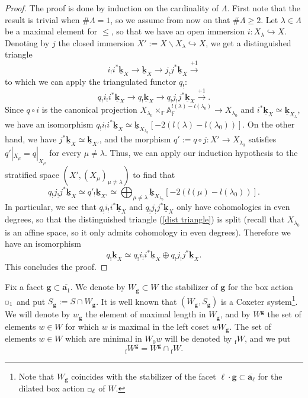 \documentclass[11pt]{amsart}
\theoremstyle{plain}
\theoremstyle{remark}
\newcommand{\car}{\mbox{\relsize{-5}$\Box$}}
\numberwithin{equation}{section}
\begin{document}
	\begin{proof}
		The proof is done by induction on the cardinality of $\Lambda$. First note that the result is trivial when $\#\Lambda=1$, so we assume from now on that $\#\Lambda\geq2$. Let $\lambda\in\Lambda$ be a maximal element for $\leq$, so that we have an open immersion $i:X_\lambda\hookrightarrow X$. Denoting by $j$ the closed immersion $X':=X\backslash X_\lambda\hookrightarrow X$, we get a distinguished triangle
		$$i_!i^* \underline{\mathbf{k}}_X\longrightarrow \underline{\mathbf{k}}_X \longrightarrow j_!j^*\underline{\mathbf{k}}_X\xrightarrow{+1}  $$
		to which we can apply the triangulated functor $q_!$:
		\begin{equation}\label{dist triangle}
			q_!i_!i^* \underline{\mathbf{k}}_X\longrightarrow q_!\underline{\mathbf{k}}_X \longrightarrow q_!j_!j^*\underline{\mathbf{k}}_X\xrightarrow{+1}. 
		\end{equation}
		Since $q\circ i$ is the canonical projection $X_{\lambda_0}\times_{\mathbb{F}} \mathbb{A}_{\mathbb{F}}^{l(\lambda)-l(\lambda_0)}\to X_{\lambda_0}$ and $i^* \underline{\mathbf{k}}_X\simeq \underline{\mathbf{k}}_{X_\lambda}$, we have an isomorphism $q_!i_!i^* \underline{\mathbf{k}}_X\simeq \underline{\mathbf{k}}_{X_{\lambda_0}}[-2(l(\lambda)-l(\lambda_0))]$. On the other hand, we have $j^*\underline{\mathbf{k}}_X\simeq\underline{\mathbf{k}}_{X'}$, and the morphism $q':=q\circ j:X'\to X_{\lambda_0}$ satisfies $q'|_{X_\mu}=q|_{X_\mu}$ for every $\mu\neq\lambda$. Thus, we can apply our induction hypothesis to the stratified space $(X',(X_\mu)_{\mu\neq\lambda})$ to find that 
		$$q_!j_!j^*\underline{\mathbf{k}}_X\simeq q'_!\underline{\mathbf{k}}_{X'}\simeq \bigoplus_{\mu\neq\lambda}\underline{\mathbf{k}}_{X_{\lambda_0}}[-2(l(\mu)-l(\lambda_0))].$$
		In particular, we see that $q_!i_!i^* \underline{\mathbf{k}}_X$ and $q_!j_!j^*\underline{\mathbf{k}}_X$ only have cohomologies in even degrees, so that the distinguished triangle (\ref{dist triangle}) is split (recall that $X_{\lambda_0}$ is an affine space, so it only admits cohomology in even degrees). Therefore we have an isomorphism
		$$ q_!\underline{\mathbf{k}}_X\simeq  q_!i_!i^* \underline{\mathbf{k}}_X\oplus q_!j_!j^*\underline{\mathbf{k}}_X.$$
		This concludes the proof.
	\end{proof}
	Fix a facet $\mathbf{g}\subset\overline{\mathbf{a}_1}$. We denote by $W_{\mathbf{g}}\subset W$ the stabilizer of $\mathbf{g}$ for the box action $\car_1$ and put $S_\mathbf{g}:=S\cap W_\mathbf{g}$. It is well known that $(W_\mathbf{g},S_\mathbf{g})$ is a Coxeter system\footnote{Note that $W_\mathbf{g}$ coincides with the stabilizer of the facet $\ell\cdot\mathbf{g}\subset\overline{\mathbf{a}_\ell}$ for the dilated box action $\car_\ell$ of $W$.}. We will denote by $w_\mathbf{g}$ the element of maximal length in $W_{\mathbf{g}}$, and by $W^{\mathbf{g}}$ the set of elements $w\in W$ for which $w$ is maximal in the left coset $wW_{\mathbf{g}}$. The set of elements $w\in W$ which are minimal in $W_0w$ will be denoted by ${_\mathrm{f}W}$, and we put $${_\mathrm{f}W}^\mathbf{g}=W^\mathbf{g}\cap {_\mathrm{f}W}.$$
\end{document}
